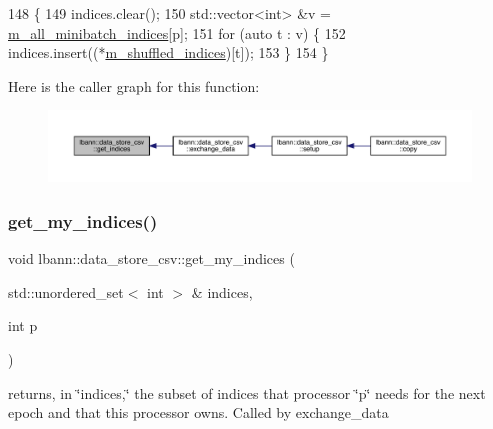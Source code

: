 \begin{DoxyCode}
148                                                                       \{
149   indices.clear();
150   std::vector<int> &v = \hyperlink{classlbann_1_1generic__data__store_afd21d4f029e450328f8703dd72702e73}{m\_all\_minibatch\_indices}[p];
151   \textcolor{keywordflow}{for} (\textcolor{keyword}{auto} t : v) \{
152     indices.insert((*\hyperlink{classlbann_1_1generic__data__store_ad456f747ee07f63df15c60833dfb82ad}{m\_shuffled\_indices})[t]);
153   \}
154 \}
\end{DoxyCode}
Here is the caller graph for this function\+:\nopagebreak
\begin{figure}[H]
\begin{center}
\leavevmode
\includegraphics[width=350pt]{classlbann_1_1data__store__csv_ae0deaa88a2f5164569f796f7d35510d8_icgraph}
\end{center}
\end{figure}
\mbox{\label{classlbann_1_1data__store__csv_ab0ebfe735a732205f7f3c66c876e20b9}} 
\subsubsection{\texorpdfstring{get\+\_\+my\+\_\+indices()}{get\_my\_indices()}}
{\footnotesize\ttfamily void lbann\+::data\+\_\+store\+\_\+csv\+::get\+\_\+my\+\_\+indices (\begin{DoxyParamCaption}\item[{std\+::unordered\+\_\+set$<$ int $>$ \&}]{indices,  }\item[{int}]{p }\end{DoxyParamCaption})\hspace{0.3cm}{\ttfamily [protected]}}

returns, in \char`\"{}indices,\char`\"{} the subset of indices that processor \char`\"{}p\char`\"{} needs for the next epoch and that this processor owns. Called by exchange\+\_\+data 

